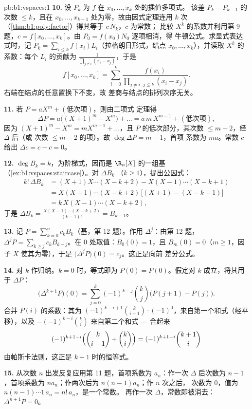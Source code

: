 \begin{solution}{pb:b1:vspaces:1}
\textbf{10.} 设 $P_k$ 为 $f$ 在 $x_0, \dots, x_k$ 处的插值多项式。
该差 $P_k - P_{k-1}$ 的次数 $\leq k$，且在
$x_0, \dots, x_{k-1}$ 处为零，故由因式定理连用 $k$ 次
（\cref{thm:b1:poly:factor}）得其等于 $c\,N_k$，$c$ 为常数；
比较 $X^{k}$ 的系数并利用第 9 题，$c =
f[x_0, \dots, x_k]$。由 $P_0 = f(x_0) N_0$ 逐项相消，得
牛顿公式。求显式表达式时，记 $P_k = \sum_{i \leq
k} f(x_i) L_i$（拉格朗日形式，结点 $x_0, \dots, x_k$），并读取
$X^{k}$ 的系数：每个 $L_i$ 的贡献为
$\frac{1}{\prod_{j \neq i}(x_i - x_j)}$，于是
\[
f[x_0, \dots, x_k] = \sum_{i=0}^{k}
\frac{f(x_i)}{\prod_{j \neq i,\, j \leq k}(x_i - x_j)} .
\]
右端在结点的任意置换下不变，故
差商与结点的排列次序无关。

\textbf{11.} 若 $P = a X^m + (\text{低次项})$，则由二项式
定理得
\[
\Delta P = a\bigl((X+1)^m - X^m\bigr) + \dots
= a\,m\,X^{m-1} + (\text{低次项}),
\]
因为 $(X+1)^m - X^m = m X^{m-1} + \dots$，且
$P$ 的低次部分，其次数 $\leq m - 2$，经 $\Delta$ 后（或
次数 $\leq m-2$ 的项）。故 $\deg \Delta P = m - 1$，首项
系数为 $m a$。常数 $c$ 给出 $\Delta c = c - c = 0$。

\textbf{12.} $\deg B_k = k$，为阶梯式，因而是
$\R_n[X]$ 的一组基（\cref{ex:b1:vspaces:staircase}）。对 $\Delta B_k$
（$k \geq 1$），提出公因式：
\begin{align*}
k!\,\Delta B_k
&= (X+1)X\cdots(X-k+2) - X(X-1)\cdots(X-k+1) \\
&= X(X-1)\cdots(X-k+2)\,\bigl[(X+1) - (X-k+1)\bigr] \\
&= k\,X(X-1)\cdots(X-k+2),
\end{align*}
于是 $\Delta B_k = \frac{X(X-1)\cdots(X-k+2)}{(k-1)!} = B_{k-1}$。

\textbf{13.} 记 $P = \sum_{k=0}^{n} c_k B_k$（基，第
12 题）。作用 $\Delta^{j}$：由第 12 题，$\Delta^{j} P = \sum_{k
\geq j} c_k B_{k-j}$。在 $0$ 处取值：$B_0(0) = 1$，且 $B_m(0) =
0$（$m \geq 1$，因子 $X$ 使其为零），于是
$\bigl(\Delta^{j}P\bigr)(0) = c_j$。这正是向前
差分公式。

\textbf{14.} 对 $k$ 作归纳。$k = 0$ 时，等式即为
$P(0) = P(0)$。假定对 $k$ 成立，将其用于 $\Delta P$：
\[
\bigl(\Delta^{k+1} P\bigr)(0)
= \sum_{j=0}^{k} (-1)^{k-j}\binom kj \bigl(P(j+1) - P(j)\bigr).
\]
合并 $P(i)$ 的系数：其为 $(-1)^{k-i+1}\binom
k{i-1}\cdot(-1)^{0}$，来自第一个和式（经平移），以及
$-(-1)^{k-i}\binom ki$ 来自第二个和式 --- 合起来
\[
(-1)^{k+1-i}\Bigl(\binom k{i-1} + \binom ki\Bigr)
= (-1)^{k+1-i}\binom{k+1}i
\]
由帕斯卡法则，这正是 $k + 1$ 时的恒等式。

\textbf{15.} 从次数 $n$ 出发反复应用第 11 题，首项系数为
$a_n$：作一次 $\Delta$ 后次数为 $n-1$，首项系数为
$n a_n$；作两次后为 $n(n-1)a_n$；作 $n$ 次之后，
次数为 $0$，值为 $n(n-1)\cdots 1\, a_n = n!\,a_n$，是一个常数。
再作一次 $\Delta$，常数即被消去：$\Delta^{n+1}P = 0$。


\end{solution}
